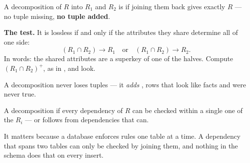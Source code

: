 \begin{definitionbox}
A decomposition of $R$ into $R_1$ and $R_2$ is  if joining them
back gives exactly $R$ --- no tuple missing, \textbf{no tuple added}.

\smallskip
\textbf{The test.} It is lossless if and only if the attributes they share
determine all of one side:
\[
  (R_1 \cap R_2) \rightarrow R_1 \quad\text{or}\quad
  (R_1 \cap R_2) \rightarrow R_2 .
\]
In words: the shared attributes are a superkey of one of the halves. Compute
$(R_1 \cap R_2)^{+}$, as in , and look.

\smallskip
A  decomposition never loses tuples --- it \emph{adds}
, rows that look like facts and were never true.
\end{definitionbox}

\begin{definitionbox}
A decomposition  if every dependency of $R$ can be
checked within a single one of the $R_i$ --- or follows from dependencies that
can.

\smallskip
It matters because a database enforces rules one table at a time. A
dependency that spans two tables can only be checked by joining them, and
nothing in the schema does that on every insert.
\end{definitionbox}

